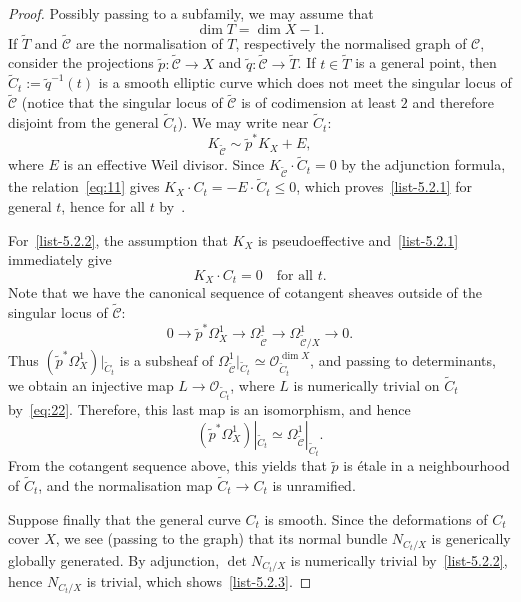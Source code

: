\documentclass[11pt]{article}
\theoremstyle{definition}
\numberwithin{equation}{section}
\numberwithin{figure}{section}
\numberwithin{table}{section}
\newcommand\sC{\mathcal{C}}
\newcommand{\OO}{\mathcal{O}}
\begin{document}
\begin{proof}
Possibly passing to a subfamily, we may assume that
\[
\dim T = \dim X - 1.
\]
If $\widetilde{T}$ and $\widetilde{\sC}$ are the normalisation of $T$, respectively the normalised graph of $\sC$, consider the projections $\widetilde{p} \colon \widetilde {\sC} \to X$ and $\widetilde q\colon \widetilde {\sC} \to \widetilde{T}$. If $t \in \widetilde{T}$ is a general point, then $\widetilde {C}_t:=\widetilde{q}^{-1}(t)$ is a smooth elliptic curve which does not meet the singular locus of $\widetilde{\sC}$ (notice that the singular locus of $\widetilde {\sC}$ is of codimension at least $2$ and therefore disjoint from the general $\widetilde{C}_t$). We may write near $\widetilde{C}_t$:
\begin{equation}\label{eq:11}
K_{\widetilde{\sC}} \sim \widetilde{p}^*K_X + E,
\end{equation}
where $E$ is an effective Weil divisor. Since $K_{\widetilde{\sC}} \cdot \widetilde{C}_t = 0$ by the adjunction formula, the relation~\eqref{eq:11} gives $K_X\cdot C_t=-E\cdot\widetilde{C}_t\leq0$, which proves~\eqref{list-5.2.1} for general $t$, hence for all $t$ by~\cite[Proposition~I.3.12]{Kol96}.

For~\eqref{list-5.2.2}, the assumption that $K_X$ is pseudoeffective and~\eqref{list-5.2.1} immediately give
\begin{equation}\label{eq:22}
K_X \cdot C_t=0 \quad\text{for all }t.
\end{equation}
Note that we have the canonical sequence of cotangent sheaves outside of the singular locus of $\widetilde{\sC}$:
\[
0 \to \widetilde{p}^*\Omega^1_X \to \Omega^1_{\widetilde {\sC}} \to \Omega^1_{\widetilde {\sC}/X} \to 0.
\]
Thus $(\widetilde{p}^*\Omega^1_X)|_{\widetilde C_t}$ is a subsheaf of $\Omega^1_{\widetilde {\sC}}|_{\widetilde C_t} \simeq \OO_{\widetilde C_t}^{\dim X}$, and passing to determinants, we obtain an injective map $L\to \OO_{\widetilde C_t}$, where $L$ is numerically trivial on $\widetilde C_t$ by~\eqref{eq:22}. Therefore, this last map is an isomorphism, and hence
\[
(\widetilde p^*\Omega^1_X)|_{\widetilde C_t} \simeq \Omega^1_{\widetilde {\sC}}|_{\widetilde C_t}.
\]
From the cotangent sequence above, this yields that $\widetilde p$ is étale in a neighbourhood of $\widetilde C_t$, and the normalisation map $\widetilde C_t \to C_t$ is unramified.


Suppose finally that the general curve $C_t$ is smooth. Since the deformations of $C_t$ cover $X$, we see (passing to the graph) that its normal bundle $N_{C_t/X}$ is generically globally generated. By adjunction, $\det N_{C_t/X}$ is numerically trivial by~\eqref{list-5.2.2}, hence $N_{C_t/X}$ is trivial, which shows~\eqref{list-5.2.3}.
\end{proof}
\end{document}
